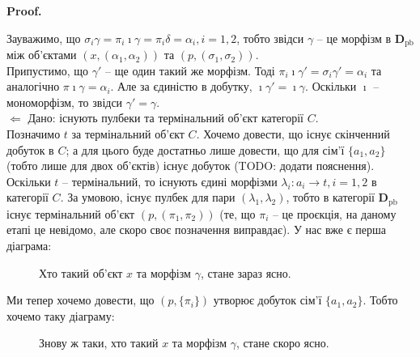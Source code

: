\documentclass[a4paper, 10pt]{article}
\makeatletter
\def\leftproof{$\boxed{\Leftarrow}$ }
\theoremstyle{theoremdd}
\renewenvironment{proof}[1][Proof.\\]{\par
\pushQED{\hfill \qed}%
\normalfont \topsep6\p@\@plus6\p@\relax
\trivlist
\item\relax
{\bfseries
#1\@addpunct{.}}\hspace\labelsep\ignorespaces
}{%
\popQED\endtrivlist\@endpefalse
}
\makeatother
\begin{document}
\begin{proof}
Зауважимо, що $\sigma_i \gamma = \pi_i \imath \gamma = \pi_i \delta = \alpha_i, i = 1,2$, тобто звідси $\gamma$ -- це морфізм в $\textbf{D}_{\text{pb}}$ між об'єктами $(x,(\alpha_1,\alpha_2))$ та $(p,(\sigma_1,\sigma_2))$.\\
Припустимо, що $\gamma'$ -- ще один такий же морфізм. Тоді $\pi_i \imath \gamma' = \sigma_i \gamma' = \alpha_i$ та аналогічно $\pi \imath \gamma = \alpha_i$. Але за єдиністю в добутку, $\imath \gamma' = \imath \gamma$. Оскільки $\imath$ -- мономорфізм, то звідси $\gamma' = \gamma$.
\bigskip \\
\leftproof Дано: існують пулбеки та термінальний об'єкт категорії $C$.\\
Позначимо $t$ за термінальний об'єкт $C$. Хочемо довести, що існує скінченний добуток в $C$; а для цього буде достатньо лише довести, що для сім'ї $\{a_1,a_2\}$ (тобто лише для двох об'єктів) існує добуток (TODO: додати пояснення).\\
Оскільки $t$ -- термінальний, то існують єдині морфізми $\lambda_i \colon a_i \to t, i = 1,2$ в категорії $C$. За умовою, існує пулбек для пари $(\lambda_1,\lambda_2)$, тобто в категорії $\textbf{D}_{\text{pb}}$ існує термінальний об'єкт $(p,(\pi_1,\pi_2))$ (те, що $\pi_i$ -- це проєкція, на даному етапі це невідомо, але скоро своє позначення виправдає). У нас вже є перша діаграма:
\begin{figure}[H]
\centering
{}
\caption*{Хто такий об'єкт $x$ та морфізм $\gamma$, стане зараз ясно.}
\end{figure}
\noindent Ми тепер хочемо довести, що $(p,\{\pi_i\})$ утворює добуток сім'ї $\{a_1,a_2\}$. Тобто хочемо таку діаграму:
\begin{figure}[H]
\centering
{}
\caption*{Знову ж таки, хто такий $x$ та морфізм $\gamma$, стане скоро ясно.}

\end{figure}
\end{proof}
\end{document}
